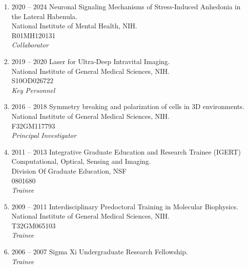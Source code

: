 \begin{enumerate}
\item 2020 -- 2024
\hspace{8pt} 
Neuronal Signaling Mechanisms of Stress-Induced Anhedonia in the Lateral Habenula. \\
National Institute of Mental Health, NIH. \\
R01MH120131 \\ 
{\it Collaborator}

\item 2019 -- 2020 
\hspace{8pt} 
Laser for Ultra-Deep Intravital Imaging.\\
National Institute of General Medical Sciences, NIH. \\
S10OD026722 \\
{\it Key Personnel}

\item 2016 -- 2018 
\hspace{8pt} 
Symmetry breaking and polarization of cells in 3D environments.\\
National Institute of General Medical Sciences, NIH.\\
F32GM117793 \\
{\it Principal Investigator} 

\item 2011 -- 2013 
\hspace{8pt}
Integrative Graduate Education and Research Trainee (IGERT)\\
Computational, Optical, Sensing and Imaging.\\
Division Of Graduate Education, NSF \\
0801680\\
{\it Trainee}

\item 2009 -- 2011
\hspace{8pt}
Interdisciplinary Predoctoral Training in Molecular Biophysics. \\
National Institute of General Medical Sciences, NIH. \\
T32GM065103 \\
{\it Trainee}

\item 2006 -- 2007 
\hspace{8pt} 
Sigma Xi Undergraduate Research Fellowship. \\
{\it Trainee}

\end{enumerate}
